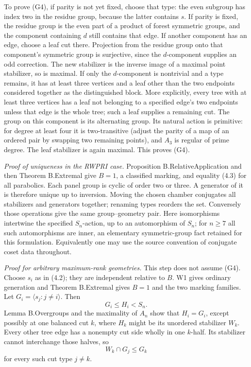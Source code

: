 \documentclass[
  11pt,
  a4paper,
]{article}
\begin{document}
To prove (G4), if parity is not yet fixed, choose that type: the even
subgroup has index two in the residue group, because the latter contains
\(s\). If parity is fixed, the residue group is the even part of a
product of forest symmetric groups, and the component containing \(d\)
still contains that edge. If another component has an edge, choose a
leaf cut there. Projection from the residue group onto that component's
symmetric group is surjective, since the \(d\)-component supplies an odd
correction. The new stabilizer is the inverse image of a maximal point
stabilizer, so is maximal. If only the \(d\)-component is nontrivial and
a type remains, it has at least three vertices and a leaf other than the
two endpoints considered together as the distinguished block. More
explicitly, every tree with at least three vertices has a leaf not
belonging to a specified edge's two endpoints unless that edge is the
whole tree; such a leaf supplies a remaining cut. The group on this
component is its alternating group. Its natural action is primitive: for
degree at least four it is two-transitive (adjust the parity of a map of
an ordered pair by swapping two remaining points), and \(A_3\) is
regular of prime degree. The leaf stabilizer is again maximal. This
proves (G4).

\emph{Proof of uniqueness in the RWPRI case.} Proposition
B.RelativeApplication and then Theorem B.Extremal give \(B=1\), a
classified marking, and equality (4.3) for all parabolics. Each panel
group is cyclic of order two or three. A generator of it is therefore
unique up to inversion. Moving the chosen chamber conjugates all
stabilizers and generators together; renaming types reorders the set.
Conversely those operations give the same group--geometry pair. Here
isomorphisms intertwine the specified \(S_n\)-action, up to an
automorphism of \(S_n\); for \(n\geq7\) all such automorphisms are
inner, an elementary symmetric-group fact retained for this formulation.
Equivalently one may use the source convention of conjugate coset data
throughout.

\emph{Proof for arbitrary maximum-rank geometries.} This step does not
assume (G4). Choose \(s_i\) as in (4.2); they are independent relative
to \(B\). W1 gives ordinary generation and Theorem B.Extremal gives
\(B=1\) and the two marking families. Let
\(G_i=\langle s_j:j\ne i\rangle\). Then \[
G_i\leq H_i<S_n.
\] Lemma B.Overgroups and the maximality of \(A_n\) show that
\(H_i=G_i\), except possibly at one balanced cut \(k\), where \(H_k\)
might be its unordered stabilizer \(W_k\). Every other tree edge has a
nonempty cut side wholly in one \(k\)-half. Its stabilizer cannot
interchange those halves, so \[
W_k\cap G_j\leq G_k
\tag{5.1}
\] for every such cut type \(j\ne k\).
\end{document}
